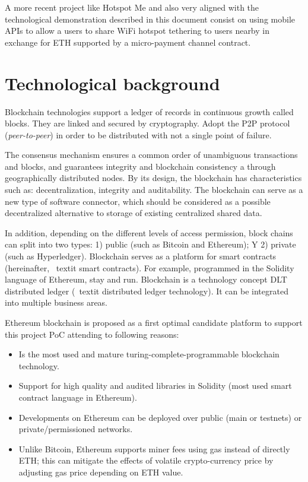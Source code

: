 \documentclass[12pt]{amsart}
\begin{document}
\begin{multicols}{2}
\vspace{0.35cm}

A more recent project like Hotspot Me\cite{hotspotme}
and also very aligned with the technological demonstration
described in this document consist on using mobile
APIs to allow a users to share WiFi hotspot tethering
to users nearby in exchange for ETH supported by a
micro-payment channel contract.


\section{Technological background}\label{ch:bc}

\vspace{0.35cm}

Blockchain technologies support a ledger of records in
continuous growth called blocks.
They are linked and secured by
cryptography. Adopt the P2P protocol
(\textit{peer-to-peer}) in order to be distributed
with not a single point of failure.

\vspace{0.35cm}

The consensus mechanism ensures a common order
of unambiguous transactions and
blocks, and guarantees integrity and
blockchain consistency a
through geographically distributed nodes.
By its design, the blockchain has characteristics
such as: decentralization, integrity and auditability.
The blockchain can serve as a new
type of software connector, which should be considered
as a possible decentralized alternative to storage
of existing centralized shared data.

\vspace{0.35cm}

In addition, depending on the different levels of
access permission, block chains can
split into two types:
1) public (such as Bitcoin and Ethereum); Y
2) private (such as Hyperledger). Blockchain serves
as a platform for smart contracts
(hereinafter, \ textit {smart contracts}).
For example, programmed in the Solidity language of
Ethereum, stay and run.
Blockchain is a technology concept
DLT distributed ledger
(\ textit {distributed ledger technology}).
It can be integrated into multiple business areas.


Ethereum
blockchain is proposed as a first optimal candidate platform
to support this project PoC attending to
following reasons:

\begin{itemize}
\item Is the most used and mature 
turing-complete-programmable blockchain technology.
\item Support for high quality and audited 
libraries in Solidity (most used smart contract language in Ethereum).
\item Developments on Ethereum can be deployed 
over public (main or testnets) or private/permissioned networks.
\item Unlike Bitcoin, Ethereum supports miner fees using gas
instead of directly ETH; this can mitigate the effects of
volatile crypto-currency price by adjusting gas price depending
on ETH value.
\end{itemize}


\end{multicols}
\end{document}
